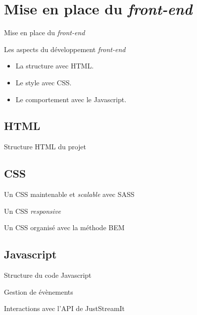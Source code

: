 \section{Mise en place du \textit{front-end}}

\begin{frame}{Mise en place du \textit{front-end}}
  \begin{block}{Les aspects du développement \textit{front-end}}
    \begin{itemize}
    \item La structure avec HTML.
    \item Le style avec CSS.
    \item Le comportement avec le Javascript.
    \end{itemize}
  \end{block}
\end{frame}

\subsection{HTML}
\begin{frame}{Structure HTML du projet}
\end{frame}

\subsection{CSS}

\begin{frame}{Un CSS maintenable et \textit{scalable} avec SASS}
\end{frame}

\begin{frame}{Un CSS \textit{responsive}}
\end{frame}

\begin{frame}{Un CSS organisé avec la méthode BEM}
\end{frame}

\subsection{Javascript}
\begin{frame}{Structure du code Javascript}
\end{frame}

\begin{frame}{Gestion de évènements}
\end{frame}

\begin{frame}{Interactions avec l'API de JustStreamIt}
\end{frame}
